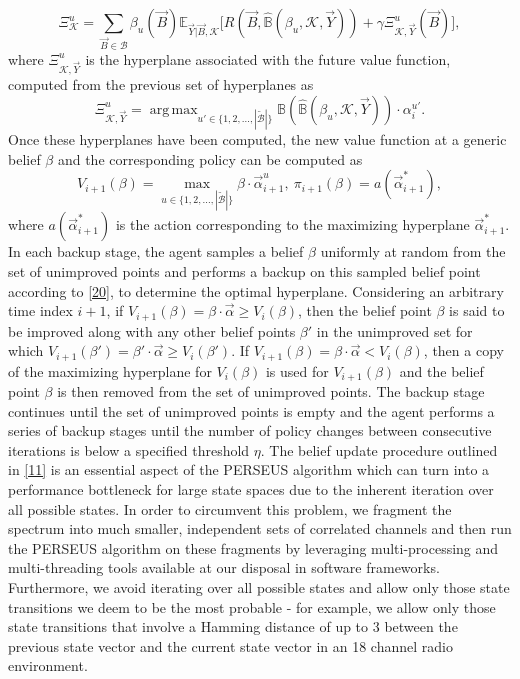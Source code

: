 \documentclass[10pt,twocolumn]{IEEEtran}
\DeclareMathOperator*{\argmax}{arg\,max}
\begin{document}
\begin{equation}
        \Xi_{\mathcal{K}}^{u} = \sum_{\vec{B} {\in} \mathcal{B}} \beta_{u}(\vec{B}) \mathbb{E}_{\vec{Y}|\vec{B}, \mathcal{K}} \Big[R(\vec{B}, \hat{\mathbb{B}}(\beta_{u}, \mathcal{K}, \vec{Y}))+\gamma 
        \Xi_{\mathcal{K}, \vec{Y}}^{u}(\vec{B})\Big],
\nonumber
\end{equation}
where $\Xi_{\mathcal{K}, \vec{Y}}^{u}$ is the hyperplane associated with the future value function, computed from the previous set of hyperplanes as
\begin{equation}
    \Xi_{\mathcal{K}, \vec{Y}}^{u}=\argmax_{u' {\in} \{1, 2, \dots, |\tilde{\mathcal{B}}|\}} \mathbb{B}(\hat{\mathbb{B}}(\beta_{u}, \mathcal{K}, \vec{Y}))\cdot\alpha_{i}^{u'}.
\nonumber
\end{equation}
Once these hyperplanes have been computed, the new value function at a generic belief $\beta$ and the corresponding policy can be computed as
\begin{equation}\label{40}
V_{i+1}(\beta) =\!\!\!\!\!\!\!\!\max_{u {\in} \{1, 2, \dots, |\tilde{\mathcal{B}}|\}}\! \beta \cdot \vec{\alpha}_{i+1}^u,
\ \pi_{i+1}(\beta) = a(\vec{\alpha}_{i+1}^{*}),\!\!
\end{equation}
where $a(\vec{\alpha}_{i+1}^{*})$ is the action corresponding to the maximizing hyperplane $\vec{\alpha}_{i+1}^{*}$. In each backup stage, the agent samples a belief $\beta$ uniformly at random from the set of unimproved points and performs a backup on this sampled belief point according to \eqref{20}, to determine the optimal hyperplane. Considering an arbitrary time index $i{+}1$, if $V_{i+1}(\beta){=}\beta{\cdot}\vec{\alpha}{\geq}V_{i}(\beta)$, then the belief point $\beta$ is said to be improved along with any other belief points $\beta'$ in the unimproved set for which $V_{i+1}(\beta'){=}\beta'{\cdot}\vec{\alpha}{\geq}V_{i}(\beta')$. If $V_{i+1}(\beta){=}\beta{\cdot}\vec{\alpha}{<}V_{i}(\beta)$, then a copy of the maximizing hyperplane for $V_i(\beta)$ is used for $V_{i+1}(\beta)$ and the belief point $\beta$ is then removed from the set of unimproved points. The backup stage continues until the set of unimproved points is empty and the agent performs a series of backup stages until the number of policy changes between consecutive iterations is below a specified threshold $\eta$. The belief update procedure outlined in \eqref{11} is an essential aspect of the PERSEUS algorithm which can turn into a performance bottleneck for large state spaces due to the inherent iteration over all possible states. In order to circumvent this problem, we fragment the spectrum into much smaller, independent sets of correlated channels and then run the PERSEUS algorithm on these fragments by leveraging multi-processing and multi-threading tools available at our disposal in software frameworks. Furthermore, we avoid iterating over all possible states and allow only those state transitions we deem to be the most probable - for example, we allow only those state transitions that involve a Hamming distance of up to 3 between the previous state vector and the current state vector in an 18 channel radio environment.
\vspace{-2mm}
\end{document}
